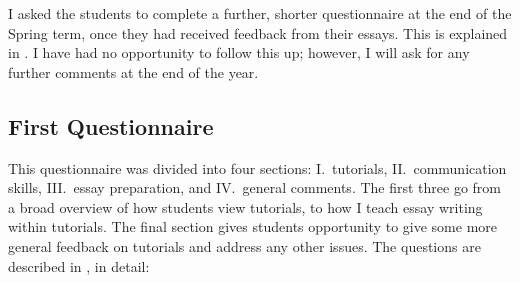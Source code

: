 I asked the students to complete a further, shorter questionnaire at the end of the Spring term, once they had received feedback from their essays. This is explained in . I have had no opportunity to follow this up; however, I will ask for any further comments at the end of the year.

\subsection{First Questionnaire}\label{sec:form1}

This questionnaire was divided into four sections: I.\ tutorials, II.\ communication skills, III.\ essay preparation, and IV.\ general comments. The first three go from a broad overview of how students view tutorials, to how I teach essay writing within tutorials. The final section gives students opportunity to give some more general feedback on tutorials and address any other issues. The questions are described in , in detail:
